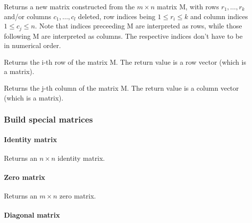 \documentclass[../Maxima_Workbook.tex]{subfiles}
\begin{document}
\lz {} \hfill \tcr{[function]}

\lz Returns a new matrix constructed from the $ m \times n $ matrix M, with rows $ r_1,\dots,r_k $ and/or columns $ c_1,\dots,c_l $ deleted, row indices being $ 1 \leq r_i \leq k $ and column indices $ 1 \leq c_j \leq n $. Note that indices preceeding M are interpreted as rows, while those following M are interpreted as columns. The respective indices don't have to be in numerical order.

\lz {} \hfill \tcr{[function]}

\lz Returns the i-th row of the matrix M. The return value is a row vector (which is a matrix).

\lz {} \hfill \tcr{[function]}

\lz Returns the j-th column of the matrix M. The return value is a column vector (which is a matrix).

\subsubsection{Build special matrices}

\paragraph{Identity matrix}\mbox{}

\lzz {} \hfill \tcr{[function]}

\lz Returns an $ n \times n $ identity matrix.

\paragraph{Zero matrix}\mbox{}

\lzz {} \hfill \tcr{[function]}

\lz Returns an $ m \times n $ zero matrix.

\paragraph{Diagonal matrix}\mbox{}

\lzz {} \hfill \tcr{[function]}
\end{document}
